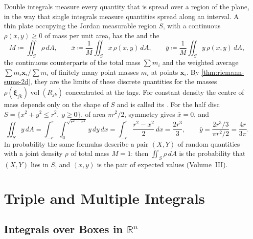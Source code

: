 Double integrals measure every quantity that is spread over a region of the plane, in the way that single integrals measure quantities spread along an interval. A thin plate occupying the Jordan measurable region $S$, with a continuous  $\rho(x,y)\ge0$ of mass per unit area, has the  and the 
\[
M\coloneqq\iint_S\rho\,dA,\qquad\bar x\coloneqq\frac1M\iint_Sx\,\rho(x,y)\,dA,\qquad\bar y\coloneqq\frac1M\iint_Sy\,\rho(x,y)\,dA ,
\]
the continuous counterparts of the total mass $\sum m_i$ and the weighted average $\sum m_i\mathbf x_i/\sum m_i$ of finitely many point masses $m_i$ at points $\mathbf x_i$. By \cref{thm:riemann-sums-2d}, they are the limits of these discrete quantities for the masses $\rho(\boldsymbol\xi_{jk})\operatorname{vol}(R_{jk})$ concentrated at the tags. For constant density the centre of mass depends only on the shape of $S$ and is called its . For the half disc $S=\{x^2+y^2\le r^2,\ y\ge0\}$, of area $\pi r^2/2$, symmetry gives $\bar x=0$, and
\[
\iint_Sy\,dA=\int_{-r}^r\int_0^{\sqrt{r^2-x^2}}y\,dy\,dx=\int_{-r}^r\frac{r^2-x^2}2\,dx=\frac{2r^3}3,\qquad\bar y=\frac{2r^3/3}{\pi r^2/2}=\frac{4r}{3\pi} .
\]
In probability the same formulas describe a pair $(X,Y)$ of random quantities with a joint density $\rho$ of total mass $M=1$: then $\iint_S\rho\,dA$ is the probability that $(X,Y)$ lies in $S$, and $(\bar x,\bar y)$ is the pair of expected values (Volume~III).

\section{Triple and Multiple Integrals}
\label{sec:multiple}

\subsection{Integrals over Boxes in \texorpdfstring{$\mathbb R^n$}{R\^{}n}}

